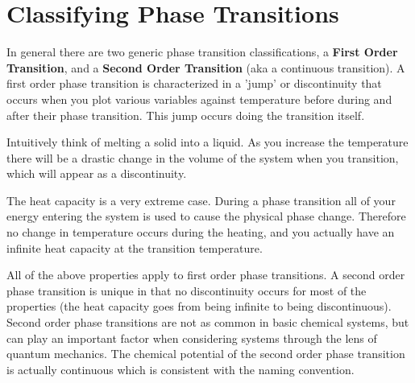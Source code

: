 \documentclass{article}
\begin{document}
\section*{Classifying Phase Transitions}
In general there are two generic phase transition classifications, a \textbf{First Order Transition}, and a \textbf{Second Order Transition} (aka a continuous transition). 
A first order phase transition is characterized in a 'jump' or discontinuity that occurs when you plot various variables against temperature before during and after their phase transition. 
This jump occurs doing the transition itself.

Intuitively think of melting a solid into a liquid. 
As you increase the temperature there will be a drastic change in the volume of the system when you transition, which will appear as a discontinuity. 

The heat capacity is a very extreme case. 
During a phase transition all of your energy entering the system is used to cause the physical phase change. 
Therefore no change in temperature occurs during the heating, and you actually have an infinite heat capacity at the transition temperature. 

All of the above properties apply to first order phase transitions. 
A second order phase transition is unique in that no discontinuity occurs for most of the properties (the heat capacity goes from being infinite to being discontinuous). 
Second order phase transitions are not as common in basic chemical systems, but can play an important factor when considering systems through the lens of quantum mechanics. 
The chemical potential of the second order phase transition is actually continuous which is consistent with the naming convention. 
\end{document}
